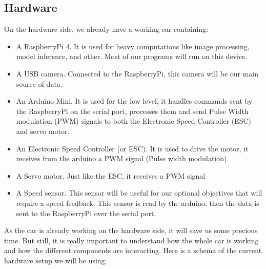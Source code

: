 \documentclass[12pt]{article}
\begin{document}
\subsection{Hardware}
On the hardware side, we already have a working car containing:
\begin{itemize}
\item A RaspberryPi 4. It is used for heavy computations like image processing, model inference, and other. Most of our programs will run on this device.
\item A USB camera. Connected to the RaspberryPi, this camera will be our main source of data.
\item An Arduino Mini. It is used for the low level, it handles commands sent by the RaspberryPi on the serial port, processes them and send Pulse Width modulation (PWM) signals to both the Electronic Speed Controller (ESC) and servo motor.
\item An Electronic Speed Controller (or ESC). It is used to drive the motor, it receives  from the arduino a PWM signal (Pulse width modulation).
\item A Servo motor. Just like the ESC, it receives a PWM signal
\item A Speed sensor. This sensor will be useful for our optional objectives that will require a speed feedback. This sensor is read by the arduino, then the data is sent to the RaspberryPi over the serial port.
\end{itemize}

As the car is already working on the hardware side, it will save us some precious time. But still, it is really important to understand how the whole car is working and how the different components are interacting.
Here is a schema of the current hardware setup we will be using:
\newpage

\end{document}
